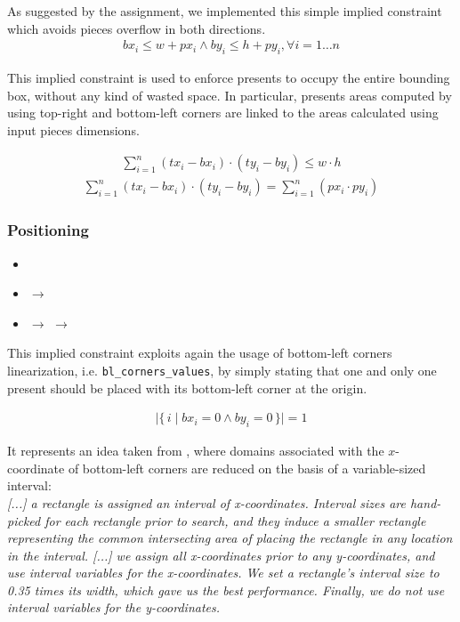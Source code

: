 \documentclass[a4paper,10pt]{article}
\newcommand{\xmark}{\ding{55}}%
\newcounter{subsubsubsection}[subsubsection]
\begin{document}
As suggested by the assignment, we implemented this simple implied constraint which avoids pieces overflow in both directions.
\begin{gather*}
   bx_{i} \leq w + px_{i} \wedge by_{i} \leq h + py_{i}, \forall{i = 1 \dots n}
\end{gather*}

 \label{sec:areas-summation}
This implied constraint is used to enforce presents to occupy the entire bounding box, without any kind of wasted space.
In particular, presents areas computed by using top-right and bottom-left corners are linked to the areas calculated using input pieces dimensions.

\begin{gather*}
   \sum_{i=1}^{n} (tx_{i} - bx_{i}) \cdot (ty_{i} - by_{i}) \leq w \cdot h
\end{gather*}
\begin{gather*}
   \sum_{i=1}^{n} (tx_{i} - bx_{i}) \cdot (ty_{i} - by_{i}) = \sum_{i=1}^{n} (px_{i} \cdot py_{i}) 
\end{gather*}

\subsubsection{Positioning}
\begin{itemize}
   \item {}
   \item {} $\rightarrow$ \xmark
   \item {} $\rightarrow$ $\rightarrow$ \xmark
\end{itemize}

 \label{sec:present-at-origin}
This implied constraint exploits again the usage of bottom-left corners linearization, i.e. \texttt{bl\_corners\_values},
by simply stating that one and only one present should be placed with its bottom-left corner at the origin.

\begin{gather*}
   \lvert\{\,i \mid bx_{i} = 0 \wedge by_{i} = 0\,\}\rvert = 1
\end{gather*}

 \label{sec:intervals-approach}
It represents an idea taken from \cite{rect-packing}, where domains associated with the $x$-coordinate of bottom-left corners are reduced on the basis of a variable-sized interval:\\
\emph{[...] a rectangle is assigned an interval of x-coordinates. Interval sizes are hand-picked for each rectangle prior to search, and they induce a smaller rectangle representing the common intersecting area of placing the rectangle in any location in the interval. [...] we assign all x-coordinates prior to any y-coordinates, and use interval variables for the x-coordinates. We set a rectangle’s interval size to 0.35 times its width, which gave us the best performance. Finally, we do not use interval variables for the y-coordinates.}
\end{document}
